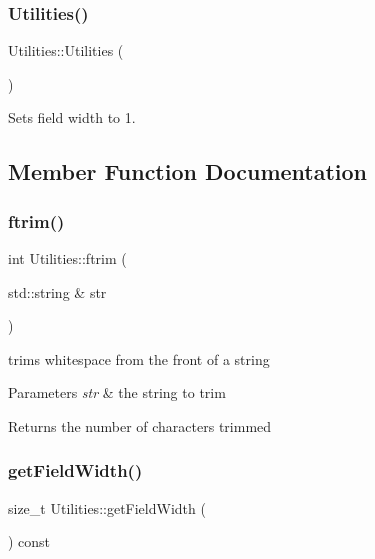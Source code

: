 \subsubsection{\texorpdfstring{Utilities()}{Utilities()}}
{\footnotesize\ttfamily Utilities\+::\+Utilities (\begin{DoxyParamCaption}{ }\end{DoxyParamCaption})}



Sets field width to 1. 



\subsection{Member Function Documentation}
\mbox{\label{class_utilities_a8f3e9e16a823944a3bdb67c6c3d70d08}} 
\subsubsection{\texorpdfstring{ftrim()}{ftrim()}}
{\footnotesize\ttfamily int Utilities\+::ftrim (\begin{DoxyParamCaption}\item[{std\+::string \&}]{str }\end{DoxyParamCaption})}



trims whitespace from the front of a string 


\begin{DoxyParams}{Parameters}
{\em str} & the string to trim \\
\hline
\end{DoxyParams}
\begin{DoxyReturn}{Returns}
the number of characters trimmed 
\end{DoxyReturn}
\mbox{\label{class_utilities_a94abc3ceade71097979e76e15008efba}} 
\subsubsection{\texorpdfstring{get\+Field\+Width()}{getFieldWidth()}}
{\footnotesize\ttfamily size\+\_\+t Utilities\+::get\+Field\+Width (\begin{DoxyParamCaption}{ }\end{DoxyParamCaption}) const}



